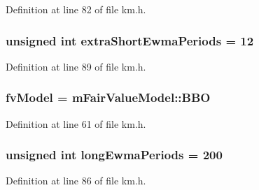 Definition at line 82 of file km.\+h.

\subsubsection[{\texorpdfstring{extra\+Short\+Ewma\+Periods}{extraShortEwmaPeriods}}]{\setlength{\rightskip}{0pt plus 5cm}unsigned int extra\+Short\+Ewma\+Periods = 12}\hypertarget{struct_k_1_1m_quoting_params_a9e3ade82ef85cb29dfb6f493b64df9f7}{}\label{struct_k_1_1m_quoting_params_a9e3ade82ef85cb29dfb6f493b64df9f7}


Definition at line 89 of file km.\+h.

\subsubsection[{\texorpdfstring{fv\+Model}{fvModel}}]{ fv\+Model = {\bf m\+Fair\+Value\+Model\+::\+B\+BO}}\hypertarget{struct_k_1_1m_quoting_params_af91dea72c9736ae247e270dcdd166d30}{}\label{struct_k_1_1m_quoting_params_af91dea72c9736ae247e270dcdd166d30}


Definition at line 61 of file km.\+h.

\subsubsection[{\texorpdfstring{long\+Ewma\+Periods}{longEwmaPeriods}}]{\setlength{\rightskip}{0pt plus 5cm}unsigned int long\+Ewma\+Periods = 200}\hypertarget{struct_k_1_1m_quoting_params_a1f51ec10f77d37f7af33d3dc5161b440}{}\label{struct_k_1_1m_quoting_params_a1f51ec10f77d37f7af33d3dc5161b440}


Definition at line 86 of file km.\+h.

